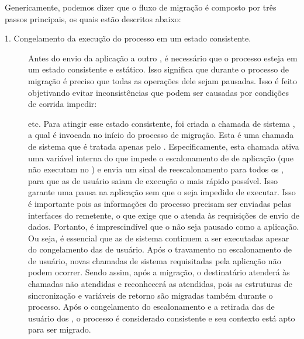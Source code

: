 Genericamente, podemos dizer que o fluxo de migração é composto por três passos principais, os quais estão descritos abaixo:
\begin{description}
	\item[1. Congelamento da execução do processo em um estado consistente.] \hfill
	
    Antes do envio da aplicação a outro \cluster, é necessário que o processo esteja em um estado consistente e estático. Isso significa que durante o processo de migração é preciso que todas as operações dele sejam pausadas. Isso é feito objetivando evitar inconsistências que podem ser causadas por condições de corrida \eg impedir:
     etc. 
    Para atingir esse estado consistente, foi criada a chamada de sistema \freeze, a qual é invocada no início do processo de migração. Esta é uma chamada de sistema que é tratada apenas pelo \mcore. Especificamente, esta chamada ativa uma variável interna do \so que impede o escalonamento de \threads de aplicação (\threads que não executam no \mcore) e envia um sinal de reescalonamento para todos os \scores, para que as \threads de usuário saiam de execução o mais rápido possível. Isso garante uma pausa na aplicação sem que o \so seja impedido de executar. Isso é importante pois as informações do processo precisam ser enviadas pelas interfaces \noc do \cluster remetente, o que exige que o \so atenda às requisições de envio de dados. Portanto, é imprescindível que o \so não seja pausado como a aplicação. Ou seja, é essencial que as \threads de sistema continuem a ser executadas apesar do congelamento das de usuário.
    Após o travamento no escalonamento de \threads de usuário, novas chamadas de sistema requisitadas pela aplicação não podem ocorrer. Sendo assim, após a migração, o \cluster destinatário atenderá às chamadas não atendidas e reconhecerá as atendidas, pois as estruturas de sincronização e variáveis de retorno são migradas também durante o processo. Após o congelamento do escalonamento e a retirada das \threads de usuário dos \scores, o processo é considerado consistente e seu contexto está apto para ser migrado.
    

\end{description}

